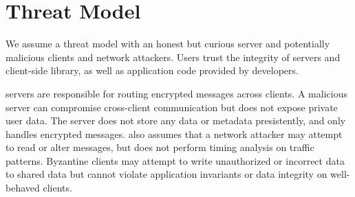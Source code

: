 \section{Threat Model}


We assume a threat model with an honest 
but curious server and 
potentially malicious clients and network attackers. 
Users trust the integrity  
of \name{} servers and client-side library,
as well as application code provided by developers. 

\name{} servers are responsible for routing encrypted messages across
clients. A malicious server can compromise cross-client communication 
but does not expose private user data. The server does 
not store any data or metadata presistently, and only handles encrypted
messages. \name{} also assumes that a network attacker may attempt
to read or alter messages, but does not perform timing analysis on 
traffic patterns.
Byzantine clients may attempt to write unauthorized or incorrect data 
to shared data but cannot violate application invariants  or data 
integrity on well-behaved clients. 

